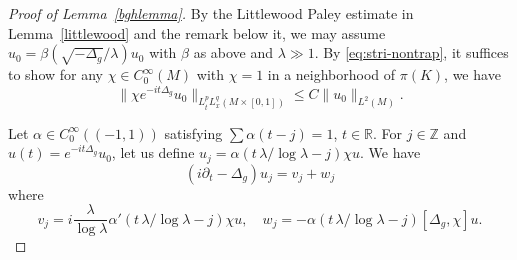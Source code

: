 \documentclass[10pt]{amsart}
\newcommand{\la}{\lambda}
\newcommand{\1}{{\bf 1}}
\begin{document}
\begin{proof}[Proof of Lemma~\ref{bghlemma}]
By the Littlewood Paley estimate in Lemma~\ref{littlewood} and the remark below it, we may assume $u_0=\beta(\sqrt{-\Delta_g}/\la)u_0$ with
$\beta$ as above and $\la\gg 1$.
By \eqref{eq:stri-nontrap}, it suffices to show for any $\chi\in C_0^{\infty}(M)$ with $\chi=1$ in a neighborhood of $\pi(K)$, we have
    \begin{equation*}
        \|\chi e^{-it\Delta_g}u_0\|_{L^p_tL^q_x(M\times [0,1])}\leq C \|u_0\|_{L^2(M)}.
    \end{equation*}























    
 Let $\alpha\in C_0^\infty((-1,1))$ satisfying $\sum \alpha(t-j)=1$, $t\in {\mathbb R}$. For $j\in \mathbb Z$  and $u(t)=e^{-it\Delta_g}u_0$, let us define $u_j=\alpha(t \,\la /\log \la-j)\chi u$. We have
    \begin{equation*}
        (i\partial_t-\Delta_g)u_j=v_j+w_j
    \end{equation*}
    where
    \begin{equation}\label{eq:def-ujvj}
        v_j=i\frac{\la}{\log \la}\alpha'(t\,\la /\log \la-j)\chi u,\quad w_j=-\alpha(t\,\la /\log \la-j)[\Delta_g,\chi]u.
    \end{equation}


\end{proof}
\end{document}
